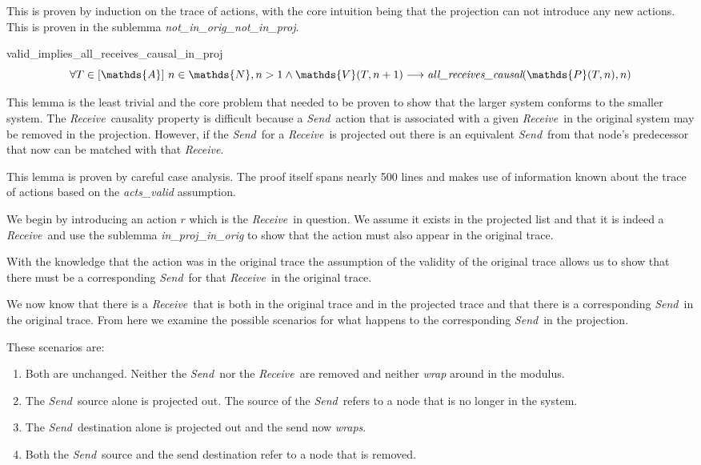 \documentclass[runningheads]{llncs}
\newcommand{\send}{\emph{Send}}
\newcommand{\receive}{\emph{Receive}}
\newcommand{\action}{\mathds{A}}
\newcommand{\listaction}{[\action]}
\newcommand{\actsvalid}[2]{\mathds{V}(#1, #2)}
\newcommand{\projectsize}[2]{\mathds{P}(#1, #2)}
\newcommand{\allrc}[2]{\emph{all\_receives\_causal}(#1, #2)}
\begin{document}
This is proven by induction on the trace of actions, with the core intuition being that the projection can not introduce any new actions. This is proven in the sublemma \emph{not\_in\_orig\_not\_in\_proj}. 


\begin{lemma}{valid\_implies\_all\_receives\_causal\_in\_proj}
$$ \forall T \in \listaction\ n \in \mathds{N}, n > 1 \wedge \actsvalid{T}{n+1} \longrightarrow \allrc{\projectsize{T}{n}}{n} $$
\end{lemma}
This lemma is the least trivial and the core problem that needed to be proven to show that the larger system conforms to the smaller system. The \receive\ causality property is difficult because a \send\ action that is associated with a given \receive\ in the original system may be removed in the projection. However, if the \send\ for a \receive\ is projected out there is an equivalent \send\ from that node's predecessor that now can be matched with that \receive. 

This lemma is proven by careful case analysis. The proof itself spans nearly 500 lines and makes use of information known about the trace of actions based on the \emph{acts\_valid} assumption. 

We begin by introducing an action $r$ which is the \receive\ in question. We assume it exists in the projected list and that it is indeed a \receive\ and use the sublemma \emph{in\_proj\_in\_orig} to show that the action must also appear in the original trace. 

With the knowledge that the action was in the original trace the assumption of the validity of the original trace allows us to show that there must be a corresponding \send\ for that \receive\ in the original trace. 

We now know that there is a \receive\ that is both in the original trace and in the projected trace and that there is a corresponding \send\ in the original trace. From here we examine the possible scenarios for what happens to the corresponding \send\ in the projection.

These scenarios are:
\begin{enumerate}
\item \label{case:normal} Both are unchanged. Neither the \send\ nor the \receive\ are removed and neither \emph{wrap} around in the modulus.
\item \label{case:src_wrap} The \send\ source alone is projected out. The source of the \send\ refers to a node that is no longer in the system.
\item \label{case:dest_wrap} The \send\ destination alone is projected out and the send now \emph{wraps}.
\item \label{case:both_wrap} Both the \send\ source and the send destination refer to a node that is removed. 
\end{enumerate}
\end{document}
